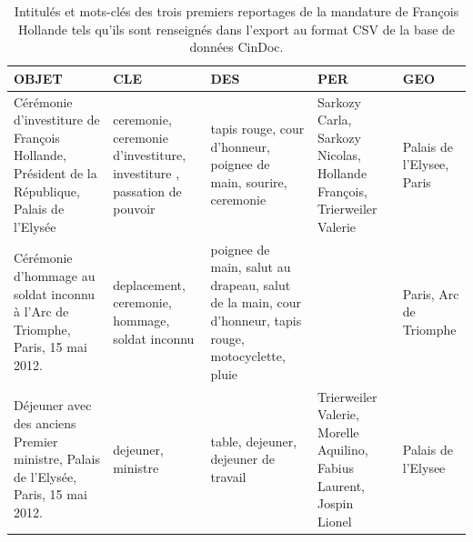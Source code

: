 \begin{table}[h]
	\begin{tabular}{|p{4cm}|p{2.5cm}|p{2.5cm}|p{2.5cm}|p{2.5cm}|}
		\hline
		\rowcolor{pastelyellow-dark}
		\textbf{OBJET} & \textbf{CLE} & \textbf{DES} & \textbf{PER} & \textbf{GEO} \\
		\hline
		\rowcolor{pastelyellow}
		Cérémonie d'investiture de François Hollande, Président de la République, Palais de l'Elysée & ceremonie, ceremonie d'investiture, investiture , passation de pouvoir & tapis rouge, cour d'honneur, poignee de main, sourire, ceremonie & Sarkozy Carla, Sarkozy Nicolas, Hollande François, Trierweiler Valerie & Palais de l'Elysee, Paris \\
		\hline
		\rowcolor{pastelyellow}
		Cérémonie d'hommage au soldat inconnu à l'Arc de Triomphe, Paris, 15 mai 2012. & deplacement, ceremonie, hommage, soldat inconnu & poignee de main, salut au drapeau, salut de la main, cour d'honneur, tapis rouge, motocyclette, pluie & & Paris, Arc de Triomphe\\
		\hline
		\rowcolor{pastelyellow}
		Déjeuner avec des anciens Premier ministre, Palais de l'Elysée, Paris, 15 mai 2012. & dejeuner, ministre & table, dejeuner, dejeuner de travail & Trierweiler Valerie, Morelle Aquilino, Fabius Laurent, Jospin Lionel & Palais de l'Elysee \\
		\hline
	\end{tabular}
	\caption{Intitulés et mots-clés des trois premiers reportages de la mandature de François Hollande tels qu'ils sont renseignés dans l'export au format CSV de la base de données CinDoc.}
\end{table}

